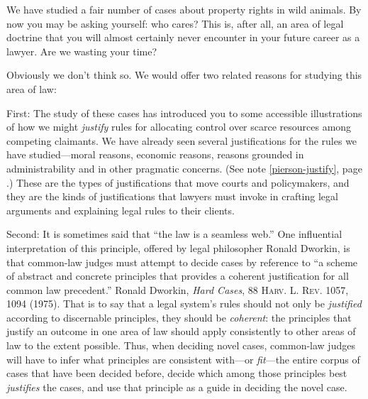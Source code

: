 We have studied a fair number of cases about property rights in wild animals. By
now you may be asking yourself: who cares? This is, after all, an area of legal
doctrine that you will almost certainly never encounter in your future career as
a lawyer. Are we wasting your time?

Obviously we don't think so. We would offer two related reasons for studying
this area of law: 

First: The study of these cases has introduced you to some accessible
illustrations of how we might \textit{justify} rules for allocating control over
scarce resources among competing claimants. We have already seen several
justifications for the rules we have studied---moral reasons, economic reasons,
reasons grounded in administrability and in other pragmatic concerns. (See
note \ref{pierson-justify}, page \pageref{pierson-justify}.) These are the types
of
justifications that move courts and policymakers, and they are the kinds of
justifications that lawyers must invoke in crafting legal arguments and
explaining legal rules to their clients. 

Second: It is sometimes said that ``the law is a seamless web.'' One influential
interpretation of this principle, offered by legal philosopher Ronald Dworkin,
is that common-law judges must attempt to decide cases by reference to ``a
scheme of abstract and concrete principles that provides a coherent
justification for all common law precedent.'' Ronald Dworkin, \textit{Hard
Cases}, 88 \textsc{Harv. L. Rev.} 1057, 1094 (1975). That is to say that a legal
system's rules should not only be \textit{justified} according to discernable
principles, they should be \textit{coherent}: the principles that justify an
outcome in one area of law should apply consistently to other areas of law to
the extent possible. Thus, when deciding novel cases, common-law judges will
have to infer what principles are consistent with---or \textit{fit}---the entire
corpus of cases that have been decided before, decide which among those
principles best \textit{justifies} the cases, and use that principle as a guide
in deciding the novel case.


